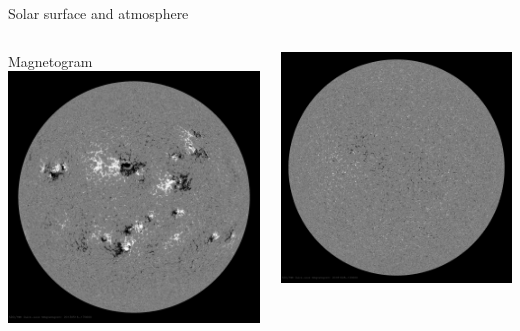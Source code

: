 \begin{frame}[plain,c,label=wavelengths]{Solar surface and atmosphere}{}
\begin{columns}[c]
		
		\centering \small Magnetogram
		\includegraphics[width=\textwidth]{../talk_figures/20130516_170000_1024_HMIB.jpg}
		
		\includegraphics[width=\textwidth]{../talk_figures/20181028_120000_1024_HMIB.jpg}
		

\end{columns}
\end{frame}
